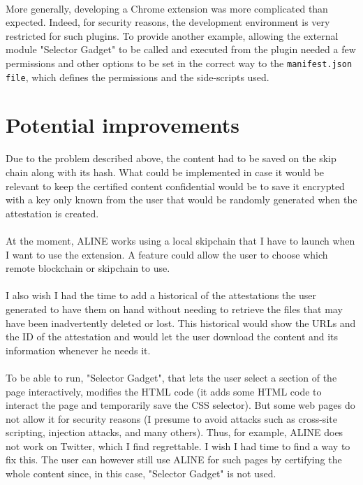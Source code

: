 \paragraph{}
More generally, developing a Chrome extension was more complicated than expected. Indeed, for security reasons, the development environment is very restricted for such plugins. To provide another example, allowing the external module "Selector Gadget" to be called and executed from the plugin needed a few permissions and other options to be set in the correct way to the \texttt{manifest.json file}, which defines the permissions and the side-scripts used.


\section{Potential improvements}
Due to the problem described above, the content had to be saved on the skip chain along with its hash. What could be implemented in case it would be relevant to keep the certified content confidential would be to save it encrypted with a key only known from the user that would be randomly generated when the attestation is created.

\paragraph{}
At the moment, ALINE works using a local skipchain that I have to launch when I want to use the extension. A feature could allow the user to choose which remote blockchain or skipchain to use.

\paragraph{}
I also wish I had the time to add a historical of the attestations the user generated to have them on hand without needing to retrieve the files that may have been inadvertently deleted or lost. This historical would show the URLs and the ID of the attestation and would let the user download the content and its information whenever he needs it.

\paragraph{}
To be able to run, "Selector Gadget", that lets the user select a section of the page interactively, modifies the HTML code (it adds some HTML code to interact the page and temporarily save the CSS selector). But some web pages do not allow it for security reasons (I presume to avoid attacks such as cross-site scripting, injection attacks, and many others). Thus, for example, ALINE does not work on  Twitter, which I find regrettable. I wish I had time to find a way to fix this. The user can however still use ALINE for such pages by certifying the whole content since, in this case, "Selector Gadget" is not used.

